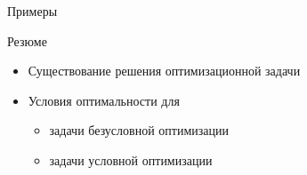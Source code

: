 \documentclass[12pt]{beamer}
\begin{document}
\begin{frame}{Примеры}
\begin{itemize}
\end{itemize}
\end{frame}

\begin{frame}{Резюме}
\begin{itemize}
\item Существование решения оптимизационной задачи 
\item Условия оптимальности для
\begin{itemize}
\item задачи безусловной оптимизации
\item задачи условной оптимизации
\end{itemize}
\end{itemize}
\end{frame}
\end{document}
